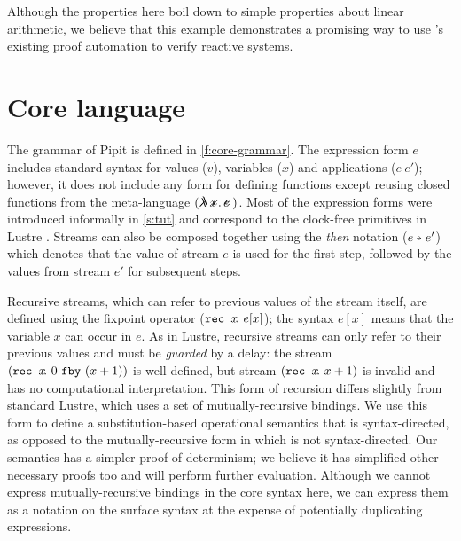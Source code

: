 \documentclass[sigplan,screen, review]{acmart}
\begin{document}
Although the properties here boil down to simple properties about linear arithmetic, we believe that this example demonstrates a promising way to use \fstar{}'s existing proof automation to verify reactive systems.

\section{Core language}
\label{s:core}


% 
% 

The grammar of Pipit is defined in \autoref{f:core-grammar}.
The expression form $e$ includes standard syntax for values ($v$), variables ($x$) and applications ($e~e'$); however, it does not include any form for defining functions except reusing closed functions from the \fstar{} meta-language $(\mlamX{})$.
Most of the expression forms were introduced informally in \autoref{s:tut} and correspond to the clock-free primitives in Lustre \cite{caspi1995functional}.
Streams can also be composed together using the \emph{then} notation ($\xthen{e}{e'}$) which denotes that the value of stream $e$ is used for the first step, followed by the values from stream $e'$ for subsequent steps.

Recursive streams, which can refer to previous values of the stream itself, are defined using the fixpoint operator ($\texttt{rec~} x \!.~e[x]$); the syntax $e[x]$ means that the variable $x$ can occur in $e$.
As in Lustre, recursive streams can only refer to their previous values and must be \emph{guarded} by a delay: the stream $(\texttt{rec~} x \!.~0~\texttt{fby}~(x + 1))$ is well-defined, but stream $(\texttt{rec~} x \!.~x + 1)$ is invalid and has no computational interpretation.
This form of recursion differs slightly from standard Lustre, which uses a set of mutually-recursive bindings.
We use this form to define a substitution-based operational semantics that is syntax-directed, as opposed to the mutually-recursive form in \citet{caspi1995functional} which is not syntax-directed.
Our semantics has a simpler proof of determinism; we believe it has simplified other necessary proofs too and will perform further evaluation.
Although we cannot express mutually-recursive bindings in the core syntax here, we can express them as a notation on the surface syntax at the expense of potentially duplicating expressions.
\end{document}
